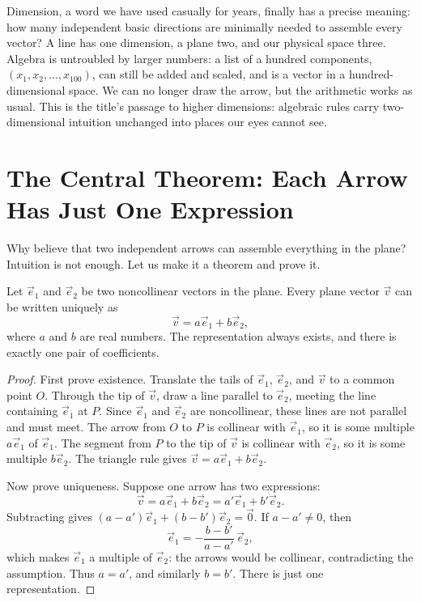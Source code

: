 Dimension, a word we have used casually for years, finally has a precise meaning: how many independent basic directions are minimally needed to assemble every vector? A line has one dimension, a plane two, and our physical space three. Algebra is untroubled by larger numbers: a list of a hundred components, $(x_1,x_2,\dots,x_{100})$, can still be added and scaled, and is a vector in a hundred-dimensional space. We can no longer draw the arrow, but the arithmetic works as usual. This is the title's passage to higher dimensions: algebraic rules carry two-dimensional intuition unchanged into places our eyes cannot see.

\section{The Central Theorem: Each Arrow Has Just One Expression}

Why believe that two independent arrows can assemble everything in the plane? Intuition is not enough. Let us make it a theorem and prove it.

\begin{dingli}
Let $\vec{e}_1$ and $\vec{e}_2$ be two noncollinear vectors in the plane. Every plane vector $\vec{v}$ can be written uniquely as
\[
\vec{v}=a\vec{e}_1+b\vec{e}_2,
\]
where $a$ and $b$ are real numbers. The representation always exists, and there is exactly one pair of coefficients.
\end{dingli}

\begin{proof}
First prove existence. Translate the tails of $\vec{e}_1$, $\vec{e}_2$, and $\vec{v}$ to a common point $O$. Through the tip of $\vec{v}$, draw a line parallel to $\vec{e}_2$, meeting the line containing $\vec{e}_1$ at $P$. Since $\vec{e}_1$ and $\vec{e}_2$ are noncollinear, these lines are not parallel and must meet. The arrow from $O$ to $P$ is collinear with $\vec{e}_1$, so it is some multiple $a\vec{e}_1$ of $\vec{e}_1$. The segment from $P$ to the tip of $\vec{v}$ is collinear with $\vec{e}_2$, so it is some multiple $b\vec{e}_2$. The triangle rule gives $\vec{v}=a\vec{e}_1+b\vec{e}_2$.

Now prove uniqueness. Suppose one arrow has two expressions:
\[
\vec{v}=a\vec{e}_1+b\vec{e}_2=a'\vec{e}_1+b'\vec{e}_2.
\]
Subtracting gives $(a-a')\vec{e}_1+(b-b')\vec{e}_2=\vec{0}$. If $a-a'\neq 0$, then
\[
\vec{e}_1=-\frac{b-b'}{a-a'}\,\vec{e}_2,
\]
which makes $\vec{e}_1$ a multiple of $\vec{e}_2$: the arrows would be collinear, contradicting the assumption. Thus $a=a'$, and similarly $b=b'$. There is just one representation.
\end{proof}

